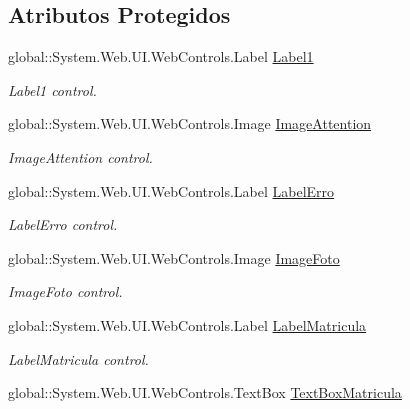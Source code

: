 \subsection*{Atributos Protegidos}
\begin{DoxyCompactItemize}
\item 
global::System.Web.UI.WebControls.Label \hyperlink{class_sistema_r_h_1_1_alterar_colaborador_ad24f8cf99449399d0fbbdf7d763ad9ec}{Label1}
\begin{DoxyCompactList}\small\item\em Label1 control. \item\end{DoxyCompactList}\item 
global::System.Web.UI.WebControls.Image \hyperlink{class_sistema_r_h_1_1_alterar_colaborador_a229a3e9094be062d93e632c0722bbaf9}{ImageAttention}
\begin{DoxyCompactList}\small\item\em ImageAttention control. \item\end{DoxyCompactList}\item 
global::System.Web.UI.WebControls.Label \hyperlink{class_sistema_r_h_1_1_alterar_colaborador_a6af8dd7667cdcbb7f618ae937dc26213}{LabelErro}
\begin{DoxyCompactList}\small\item\em LabelErro control. \item\end{DoxyCompactList}\item 
global::System.Web.UI.WebControls.Image \hyperlink{class_sistema_r_h_1_1_alterar_colaborador_ac08e2cf434bd8b4bc8d80b16d36b43a0}{ImageFoto}
\begin{DoxyCompactList}\small\item\em ImageFoto control. \item\end{DoxyCompactList}\item 
global::System.Web.UI.WebControls.Label \hyperlink{class_sistema_r_h_1_1_alterar_colaborador_a4f9a57f4da880dcfc401dfe6a31faee2}{LabelMatricula}
\begin{DoxyCompactList}\small\item\em LabelMatricula control. \item\end{DoxyCompactList}\item 
global::System.Web.UI.WebControls.TextBox \hyperlink{class_sistema_r_h_1_1_alterar_colaborador_ae09d7263d5a691e53d10ef3031330fa1}{TextBoxMatricula}

\end{DoxyCompactItemize}
